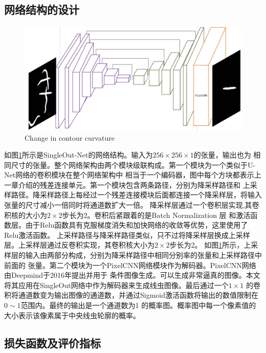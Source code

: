 \subsection{网络结构的设计}
\label{archtecture}
\begin{figure}[htb]
	  \centering
	  \includegraphics[width=14cm]{figure/chap4/arch1.jpg}
		{Change in contour curvature}
	  \label{fig:chap4:netarch}
	\end{figure}
	如图\ref{fig:chap4:netarch}所示是SingleOut-Net的网络结构。输入为$256\times256\times1$的张量，输出也为
	相同尺寸的张量。整个网络架构由两个模块级联构成。第一个模块为一个类似于U-Net网络\cite{ronneberger2015u}的卷积模块在整个网络架构中
	相当于一个编码器，图中每个方块都表示上一章介绍的残差连接单元。第一个模块包含两条路径，分别为降采样路径和
	上采样路径。降采样路径上每经过一个残差连接模块后面都连接一个降采样层，将输入张量的尺寸减小一倍同时将通道数扩大一倍。
	降采样层通过一个卷积层实现,其卷积核的大小为$2\times2$步长为2。卷积后紧跟着的是Batch Normalization 层
	和激活函数层。由于Relu函数\cite{xu2015empirical}具有克服梯度消失和加快网络的收敛等优势，这里使用了Relu激活函数。
	上采样路径与降采样路径类似，只不过将降采样层换成上采样层。上采样层通过反卷积实现，其卷积核大小为$2\times2$步长为2。
	如图\ref{fig:chap4:netarch}所示，上采样层的输入由两部分构成，分别为降采样路径中相同分别率的张量和上采样路径中前面的
	张量。第二个模块为一个PixelCNN网络\cite{van2016conditional}模块作为解码器。PixelCNN网络由Deepmind于2016年提出并用于
	条件图像生成。可以生成非常逼真的图像。本文将其应用在SingleOut网络中作为解码器来生成线虫图像。最后通过一个$1\times1$
	的卷积将通道数变为输出图像的通道数，并通过Sigmoid激活函数将输出的数值限制在$0\sim1$范围内。最终的输出是一个通道数为1
	的概率图。概率图中每一个像素值的大小表示该像素属于中央线虫轮廓的概率。

\subsection{损失函数及评价指标}
	
